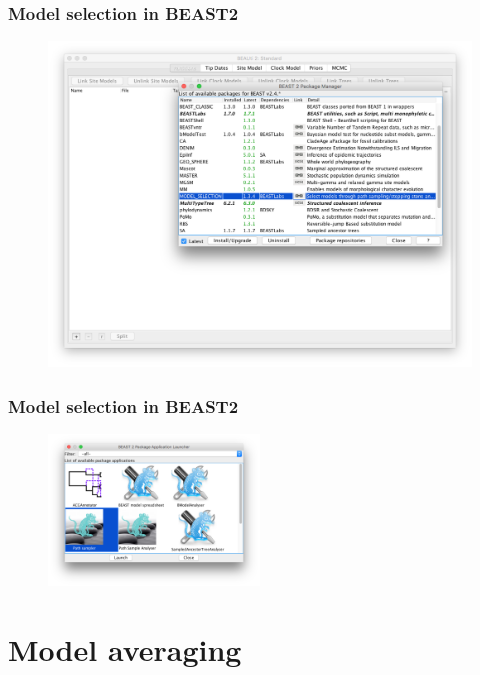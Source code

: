 \begin{frame}\frametitle{Model selection in BEAST2}

  \begin{figure}
      \includegraphics[width=\textwidth]{figures/BeautiModelSelection1}
  \end{figure}

\end{frame}

\begin{frame}\frametitle{Model selection in BEAST2}

  \begin{figure}
      \includegraphics[width=0.5\textwidth]{figures/BeautiModelSelection2}
  \end{figure}

\end{frame}

\section{Model averaging}

